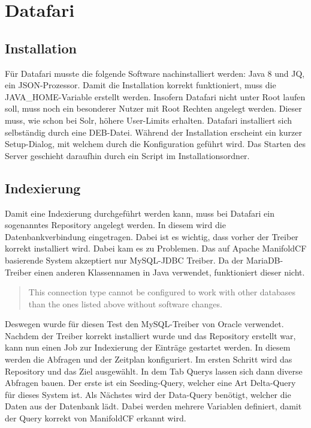 
\section{Datafari}

\subsection{Installation}

Für Datafari musste die folgende Software nachinstalliert werden: Java 8 und JQ, ein JSON-Prozessor. Damit die Installation korrekt funktioniert, muss die JAVA\_HOME-Variable erstellt werden. Insofern Datafari nicht unter Root laufen soll, muss noch ein besonderer Nutzer mit Root Rechten angelegt werden. Dieser muss, wie schon bei Solr, höhere User-Limits erhalten. Datafari installiert sich selbständig durch eine DEB-Datei. Während der Installation erscheint ein kurzer Setup-Dialog, mit welchem durch die Konfiguration geführt wird. Das Starten des Server geschieht daraufhin durch ein Script im Installationsordner.

\subsection{Indexierung}

Damit eine Indexierung durchgeführt werden kann, muss bei Datafari ein sogenanntes Repository angelegt werden. In diesem wird die Datenbankverbindung eingetragen. Dabei ist es wichtig, dass vorher der Treiber korrekt installiert wird. Dabei kam es zu Problemen.
Das auf Apache ManifoldCF basierende System akzeptiert nur MySQL-JDBC Treiber. Da der MariaDB-Treiber einen anderen Klassennamen in Java verwendet, funktioniert dieser nicht. \begin{quote} This connection type cannot be configured to work with other databases than the ones listed above without software changes.~\cite[S.~61]{ApacheSoftwareFoundation.}\end{quote} Deswegen wurde für diesen Test den MySQL-Treiber von Oracle verwendet.
Nachdem der Treiber korrekt installiert wurde und das Repository erstellt war, kann nun einen Job zur Indexierung der Einträge gestartet werden. In diesem werden die Abfragen und der Zeitplan konfiguriert.
Im ersten Schritt wird das Repository und das Ziel ausgewählt. In dem Tab Querys lassen sich dann diverse Abfragen bauen. Der erste ist ein Seeding-Query, welcher eine Art Delta-Query für dieses System ist. Als Nächstes wird der Data-Query benötigt, welcher die Daten aus der Datenbank lädt. Dabei werden mehrere Variablen definiert, damit der Query korrekt von ManifoldCF erkannt wird. 


